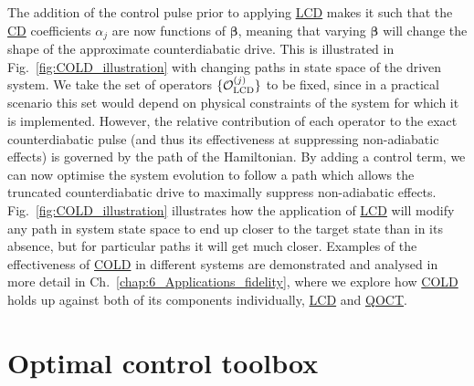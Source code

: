 \documentclass[a4paper,oneside,11pt]{book}
\newcommand{\betabb}{\boldsymbol{\beta}}
\newcommand{\acrref}[1]{\hyperref[acr:#1]{#1}}
\begin{document}
The addition of the control pulse prior to applying \acrref{LCD} makes it such that the \acrref{CD} coefficients $\alpha_j$ are now functions of $\betabb$, meaning that varying $\betabb$ will change the shape of the approximate counterdiabatic drive. This is illustrated in Fig.~\ref{fig:COLD_illustration} with changing paths in state space of the driven system. We take the set of operators $\{\mathcal{O}_{\rm LCD}^{(j)}\}$ to be fixed, since in a practical scenario this set would depend on physical constraints of the system for which it is implemented. However, the relative contribution of each operator to the exact counterdiabatic pulse (and thus its effectiveness at suppressing non-adiabatic effects) is governed by the path of the Hamiltonian. By adding a control term, we can now optimise the system evolution to follow a path which allows the truncated counterdiabatic drive to maximally suppress non-adiabatic effects. Fig.~\ref{fig:COLD_illustration} illustrates how the application of \acrref{LCD} will modify any path in system state space to end up closer to the target state than in its absence, but for particular paths it will get much closer. Examples of the effectiveness of \acrref{COLD} in different systems are demonstrated and analysed in more detail in Ch.~\ref{chap:6_Applications_fidelity}, where we explore how \acrref{COLD} holds up against both of its components individually, \acrref{LCD} and \acrref{QOCT}.

\section{Optimal control toolbox}\label{sec:4.2_COLD_QOCT}
\end{document}
